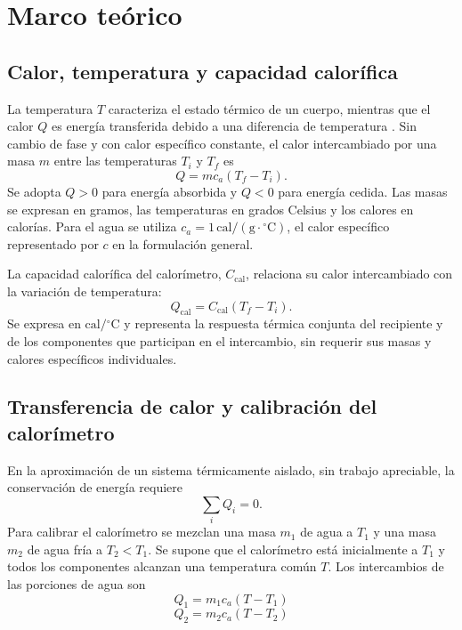 \section{Marco teórico}
\label{sec:marco_teorico}

\subsection{Calor, temperatura y capacidad calorífica}
La temperatura $T$ caracteriza el estado térmico de un cuerpo, mientras que el calor $Q$ es energía transferida debido a una diferencia de temperatura \cite{serway}. Sin cambio de fase y con calor específico constante, el calor intercambiado por una masa $m$ entre las temperaturas $T_i$ y $T_f$ es
\begin{equation}
  Q=mc_a(T_f-T_i).
  \label{eq:calor_sensible}
\end{equation}
Se adopta $Q>0$ para energía absorbida y $Q<0$ para energía cedida. Las masas se expresan en gramos, las temperaturas en grados Celsius y los calores en calorías. Para el agua se utiliza $c_a=1\,\mathrm{cal}/(\mathrm{g}\cdot{}^{\circ}\mathrm{C})$, el calor específico representado por $c$ en la formulación general.

La capacidad calorífica del calorímetro, $C_{\mathrm{cal}}$, relaciona su calor intercambiado con la variación de temperatura:
\begin{equation}
  Q_{\mathrm{cal}}=C_{\mathrm{cal}}(T_f-T_i).
  \label{eq:capacidad}
\end{equation}
Se expresa en $\mathrm{cal}/{}^{\circ}\mathrm{C}$ y representa la respuesta térmica conjunta del recipiente y de los componentes que participan en el intercambio, sin requerir sus masas y calores específicos individuales.

\subsection{Transferencia de calor y calibración del calorímetro}
En la aproximación de un sistema térmicamente aislado, sin trabajo apreciable, la conservación de energía requiere \cite{serway}
\begin{equation}
  \sum_i Q_i=0.
  \label{eq:conservacion}
\end{equation}
Para calibrar el calorímetro se mezclan una masa $m_1$ de agua a $T_1$ y una masa $m_2$ de agua fría a $T_2<T_1$. Se supone que el calorímetro está inicialmente a $T_1$ y todos los componentes alcanzan una temperatura común $T$. Los intercambios de las porciones de agua son
\begin{equation}
    Q_1=m_1c_a(T-T_1)
    \label{eq:calor_agua1}
\end{equation}
\begin{equation}
    Q_2=m_2c_a(T-T_2)
    \label{eq:calor_agua2}
\end{equation}

